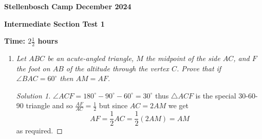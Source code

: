 \documentclass[12pt]{article}
\begin{document}
\begin{center} \Large
    \textbf{Stellenbosch Camp December 2024}
    
    \textbf{Intermediate Section Test 1}
    
    \textbf{Time: \(2 \frac{1}{2}\) hours}
\end{center}

\begin{enumerate}[itemsep=2\bigskipamount,topsep=3\bigskipamount]
\item \textit{Let $ABC$ be an acute-angled triangle, $M$ the midpoint of the side $AC$, and $F$ the foot on $AB$ of the altitude through the vertex $C$. Prove that if $\angle BAC = 60^{\circ}$ then $AM = AF$.}

\begin{proof}[Solution 1]
$\angle ACF = 180^{\circ} - 90^{\circ} - 60^{\circ} = 30^{\circ}$ thus $\triangle ACF$ is the special 30-60-90 triangle and so $\frac{AF}{AC} = \frac{1}{2}$ but since $AC = 2AM$ we get
\[ AF = \frac{1}{2}AC = \frac{1}{2}(2AM) = AM \]
as required.
\end{proof}


\end{enumerate}
\end{document}
